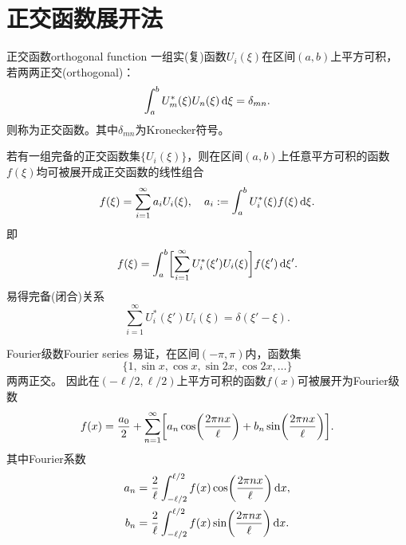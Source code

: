 \section{正交函数展开法}
\label{sec:orthogonal functions and expansions}


\begin{definition}{正交函数}{orthogonal function}
    一组实(复)函数$U_i(\xi)$在区间$(a,b)$上平方可积，若两两正交(orthogonal)：
    \begin{equation}
        \int_a^bU_m^\ast(\xi)U_n(\xi)\mathop{}\!\mathrm{d}\xi=\delta_{mn}.
    \end{equation}
    则称为正交函数。其中$\delta_{mn}$为Kronecker符号。
\end{definition}
若有一组完备的正交函数集$\{U_i(\xi)\}$，则在区间$(a,b)$上任意平方可积的函数$f(\xi)$均可被展开成正交函数的线性组合
\[
    f(\xi)=\sum_{i=1}^\infty a_iU_i(\xi),\quad a_i:=\int_a^bU_i^\ast(\xi)f(\xi)\mathop{}\!\mathrm{d}\xi.
\]
即
\[
    f(\xi)=\int_a^b\biggl[\sum_{i=1}^\infty U_i^\ast(\xi')U_i(\xi)\biggr]f(\xi')\mathop{}\!\mathrm{d}\xi'.
\]
易得完备(闭合)关系
\begin{equation}
    \sum_{i=1}^\infty U_i^\ast(\xi')U_i(\xi)=\delta(\xi'-\xi).
\end{equation}
\begin{example}{Fourier级数}{Fourier series}
    易证，在区间$(-\pi,\pi)$内，函数集
    \[
        \{1,\sin x,\cos x,\sin 2x,\cos 2x,\ldots\}
    \]
    两两正交。
    因此在$(-\ell/2,\ell/2)$上平方可积的函数$f(x)$可被展开为Fourier级数
    \begin{equation}
        f(x)=\frac{a_0}2+\sum_{n=1}^\infty\biggl[a_n\cos\biggl(\frac{2\pi nx}{\ell}\biggr)+b_n\sin\biggl(\frac{2\pi nx}{\ell}\biggr)\biggr].
    \end{equation}
    其中Fourier系数
    \begin{align*}
        a_n&=\frac2\ell\int_{-\ell/2}^{\ell/2}f(x)\cos\biggl(\frac{2\pi nx}{\ell}\biggr)\mathop{}\!\mathrm{d} x,\\
        b_n&=\frac2\ell\int_{-\ell/2}^{\ell/2}f(x)\sin\biggl(\frac{2\pi nx}{\ell}\biggr)\mathop{}\!\mathrm{d} x.
    \end{align*}
\end{example}
